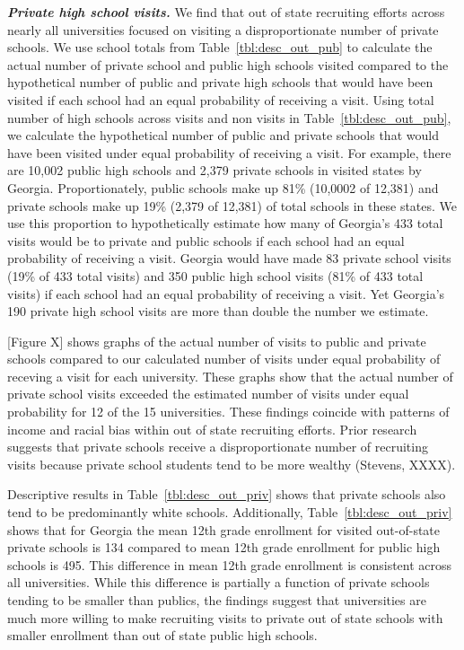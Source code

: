 \documentclass[twoside]{article}
\begin{document}
\textbf{\textit{Private high school visits.}} We find that out of state recruiting efforts across nearly all universities focused on visiting a disproportionate number of private schools. We use school totals from Table~\ref{tbl:desc_out_pub} to calculate the actual number of private school and public high schools visited compared to the hypothetical number of public and private high schools that would have been visited if each school had an equal probability of receiving a visit. Using total number of high schools across visits and non visits in Table~\ref{tbl:desc_out_pub}, we calculate the hypothetical number of public and private schools that would have been visited under equal probability of receiving a visit. For example, there are 10,002 public high schools and 2,379 private schools in visited states by Georgia. Proportionately, public schools  make up 81\%  (10,0002 of 12,381) and private schools make up 19\% (2,379 of 12,381) of total schools in these states. We use this proportion to hypothetically estimate how many of Georgia's 433 total visits would be to private and public schools if each school had an equal probability of receiving a visit. Georgia would have made 83 private school visits (19\% of 433 total visits) and 350 public high school visits (81\% of 433 total visits) if each school had an equal probability of receiving a visit. Yet Georgia’s 190 private high school visits are more than double the number we estimate.

[Figure X] shows graphs of the actual number of visits to public and private schools compared to our calculated number of visits under equal probability of receving a visit for each university. These graphs show that the actual number of private school visits exceeded the estimated number of visits under equal probability for 12 of the 15 universities. These findings coincide with patterns of income and racial bias within out of state recruiting efforts. Prior research suggests that private schools receive a disproportionate number of recruiting visits because private school students tend to be more wealthy (Stevens, XXXX).

Descriptive results in Table~\ref{tbl:desc_out_priv} shows that private schools also tend to be predominantly white schools. Additionally, Table~\ref{tbl:desc_out_priv} shows that for Georgia the mean 12th grade enrollment for visited out-of-state private schools is 134 compared to mean 12th grade enrollment for public high schools is 495. This difference in mean 12th grade enrollment is consistent across all universities. While this difference is partially a function of private schools tending to be smaller than publics, the findings suggest that universities are much more willing to make recruiting visits to private out of state schools with smaller enrollment than out of state public high schools.
\end{document}

